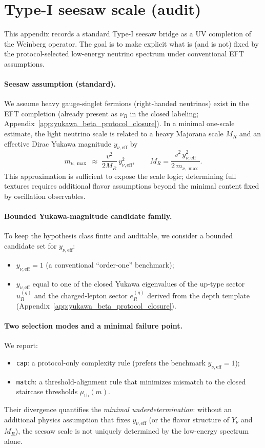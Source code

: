 \section{Type-I seesaw scale (audit)}
\label{app:neutrino_typeI_seesaw_closure}

This appendix records a standard Type-I seesaw bridge as a UV completion of the Weinberg operator.
The goal is to make explicit what is (and is not) fixed by the protocol-selected low-energy neutrino spectrum under conventional EFT assumptions.

\paragraph{Seesaw assumption (standard).}
\AuditTag We assume heavy gauge-singlet fermions (right-handed neutrinos) exist in the EFT completion (already present as $\nu_R$ in the closed labeling; Appendix~\ref{app:yukawa_beta_protocol_closure}).
In a minimal one-scale estimate, the light neutrino scale is related to a heavy Majorana scale $M_R$ and an effective Dirac Yukawa magnitude $y_{\nu,\mathrm{eff}}$ by \cite{Minkowski1977Seesaw}
\[
m_{\nu,\max}\;\approx\;\frac{v^2}{2M_R}\,y_{\nu,\mathrm{eff}}^2,
\qquad
M_R=\frac{v^2\,y_{\nu,\mathrm{eff}}^2}{2\,m_{\nu,\max}}.
\]
This approximation is sufficient to expose the scale logic; determining full textures requires additional flavor assumptions beyond the minimal content fixed by oscillation observables.

\paragraph{Bounded Yukawa-magnitude candidate family.}
\AuditTag To keep the hypothesis class finite and auditable, we consider a bounded candidate set for $y_{\nu,\mathrm{eff}}$:
\begin{itemize}
\item $y_{\nu,\mathrm{eff}}=1$ (a conventional ``order-one'' benchmark);
\item $y_{\nu,\mathrm{eff}}$ equal to one of the closed Yukawa eigenvalues of the up-type sector $u_R^{(g)}$ and the charged-lepton sector $e_R^{(g)}$ derived from the depth template (Appendix~\ref{app:yukawa_beta_protocol_closure}).
\end{itemize}

\paragraph{Two selection modes and a minimal failure point.}
\AuditTag We report:
\begin{itemize}
\item \texttt{cap}: a protocol-only complexity rule (prefers the benchmark $y_{\nu,\mathrm{eff}}=1$);
\item \texttt{match}: a threshold-alignment rule that minimizes mismatch to the closed staircase thresholds $\mu_{\mathrm{th}}(m)$.
\end{itemize}
Their divergence quantifies the \emph{minimal underdetermination}: without an additional physics assumption that fixes $y_{\nu,\mathrm{eff}}$ (or the flavor structure of $Y_\nu$ and $M_R$), the seesaw scale is not uniquely determined by the low-energy spectrum alone.

